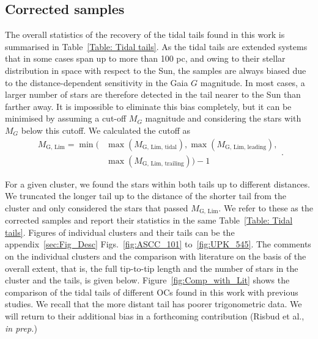 \documentclass{aa}
\newcommand{\vik}[1]{{\color{red} #1}}
\begin{document}
\subsection{Corrected samples}\label{sec: Corrected Samples}

The overall statistics of the recovery of the tidal tails found in this work is summarised in Table~\ref{Table: Tidal tails}. As the tidal tails are extended systems that in some cases span up to more than 100 pc, and owing to their stellar distribution in space with respect to the Sun, the samples are always biased due to the distance-dependent sensitivity in the Gaia $G$ magnitude. In most cases, a larger number of stars are therefore detected in the tail nearer to the Sun than farther away. It is impossible to eliminate this bias completely, but it can be minimised by assuming a cut-off $M_G$ magnitude and considering the stars with $M_G$ below this cutoff. We calculated the cutoff as
\begin{equation} \label{eq:MGlim}
\begin{split}
    M_{\text{G, Lim}} = \min\big( &\max(M_{\text{G, Lim, tidal}}), 
                                  \max(M_{\text{G, Lim, leading}}), \\
                                  &\max(M_{\text{G, Lim, trailing}}) \big) - 1
\end{split}.
\end{equation}

For a given cluster, we found the stars within both tails up to different distances. We truncated the longer tail up to the distance of the shorter tail from the cluster and only considered the stars that passed $M_{\text{G, Lim}}$. We refer to these as the corrected samples and report their statistics in the same Table~\ref{Table: Tidal tails}. Figures of individual clusters and their tails can be the appendix~\ref{sec:Fig_Desc} Figs.~\ref{fig:ASCC_101} to~\ref{fig:UPK_545}. The comments on the individual clusters and the comparison with literature on the basis of the overall extent, that is, the full tip-to-tip length and the number of stars in the cluster and the tails, is given below. Figure~\ref{fig:Comp_with_Lit} shows the comparison of the tidal tails of different OCs found in this work with previous studies. We recall that the more distant tail has poorer trigonometric data. We will return to their additional bias in a forthcoming contribution (Risbud et al., \textit{in prep.})

\end{document}
